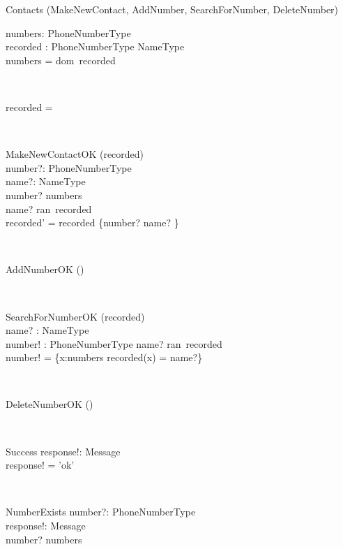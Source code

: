 \begin{class}{Contacts}
\also
\upharpoonright (MakeNewContact, AddNumber, SearchForNumber, DeleteNumber) \\
\begin{state}
numbers:  PhoneNumberType\\
recorded : PhoneNumberType \pfun NameType\\
\where
numbers = dom~recorded
\end{state} \\
\begin{init}
recorded = \emptyset %
\end{init} \\
\begin{op}{MakeNewContactOK}
\Delta (recorded) \\
number?: PhoneNumberType \\
name?: NameType \\
\ST
number? \notin numbers \\
name? \notin ran~recorded \\
recorded' = recorded \cup \{number? \mapsto name? \}
\end{op}\\
\begin{op}{AddNumberOK}
\Delta () \\
\ST
\end{op}\\
\begin{op}{SearchForNumberOK}
    \Xi (recorded) \\
    name? : NameType\\
    number! :  PhoneNumberType
    \ST
    name? \in ran~recorded\\
    number! = \{x:numbers  \mid recorded(x) = name?\}
\end{op}\\
\begin{op}{DeleteNumberOK}
\Delta () \\
\ST
\end{op}\\
\begin{op}{Success}
response!: Message \\
\ST
response! = 'ok'
\end{op}\\
\begin{op}{NumberExists}
number?: PhoneNumberType \\
response!: Message \\
\ST
number? \in numbers \\

\end{op}
\end{class}
